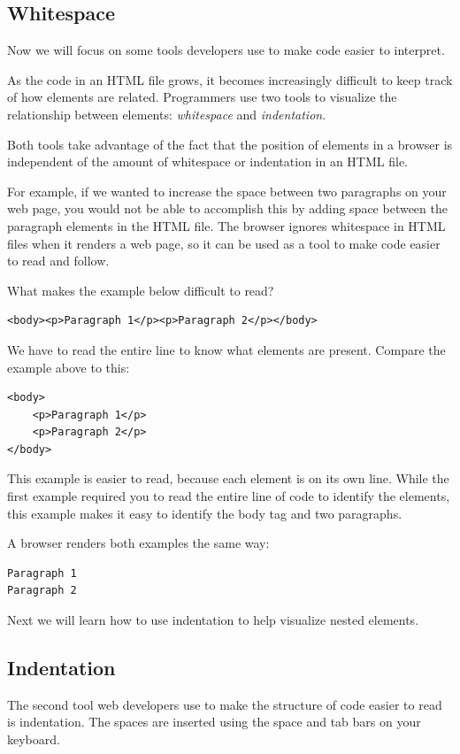\documentclass[11pt]{article}
\begin{document}
\subsection{Whitespace}
Now we will focus on some tools developers use to make code easier to interpret.

As the code in an HTML file grows, it becomes increasingly difficult to keep track of how elements are related. Programmers use two tools to visualize the relationship between elements: \textit{whitespace} and \textit{indentation}.

Both tools take advantage of the fact that the position of elements in a browser is independent of the amount of whitespace or indentation in an HTML file.

For example, if we wanted to increase the space between two paragraphs on your web page, you would not be able to accomplish this by adding space between the paragraph elements in the HTML file. The browser ignores whitespace in HTML files when it renders a web page, so it can be used as a tool to make code easier to read and follow.

What makes the example below difficult to read?
\begin{lstlisting}
<body><p>Paragraph 1</p><p>Paragraph 2</p></body>
\end{lstlisting}
We have to read the entire line to know what elements are present. Compare the example above to this:
\begin{lstlisting}
<body>
    <p>Paragraph 1</p>
    <p>Paragraph 2</p>
</body>
\end{lstlisting}
This example is easier to read, because each element is on its own line. While the first example required you to read the entire line of code to identify the elements, this example makes it easy to identify the body tag and two paragraphs.

A browser renders both examples the same way:
\begin{lstlisting}[basicstyle=\small\ttfamily\color{theWhite}, backgroundcolor = \color{theBlack}, language = Comment]
Paragraph 1
Paragraph 2
\end{lstlisting}
Next we will learn how to use indentation to help visualize nested elements.

\subsection{Indentation}
The second tool web developers use to make the structure of code easier to read is indentation. The spaces are inserted using the space and tab bars on your keyboard.
\end{document}
